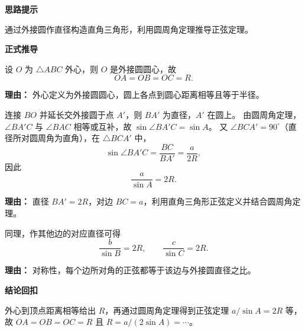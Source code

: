 \begin{proofbox}
	\textbf{\textcolor{CProof}{思路提示}}

	通过外接圆作直径构造直角三角形，利用圆周角定理推导正弦定理。

	\medskip
	\textbf{\textcolor{CProof}{正式推导}}
	\begin{description}[style=nextline, leftmargin=2.8em, labelsep=0.5em, itemsep=0.55em]
		\item[\textbf{步骤一（外心定义）：}]
			设 $O$ 为 $\triangle ABC$ 外心，则 $O$ 是外接圆圆心，故
			\[
				OA = OB = OC = R.
			\]
			\par\textbf{理由：}
			外心定义为外接圆圆心，圆上各点到圆心距离相等且等于半径。

		\item[\textbf{步骤二（构造直径）：}]
			连接 $BO$ 并延长交外接圆于点 $A'$，则 $BA'$ 为直径，$A'$ 在圆上。
			由圆周角定理，$\angle BA'C$ 与 $\angle BAC$ 相等或互补，故 $\sin\angle BA'C = \sin A$。
			又 $\angle BCA' = 90^\circ$（直径所对圆周角为直角），在 $\triangle BCA'$ 中，
			\[
				\sin\angle BA'C = \frac{BC}{BA'} = \frac{a}{2R},
			\]
			因此
			\[
				\frac{a}{\sin A} = 2R.
			\]
			\par\textbf{理由：}
			直径 $BA' = 2R$，对边 $BC = a$，利用直角三角形正弦定义并结合圆周角定理。

		\item[\textbf{步骤三（推广至全等）：}]
			同理，作其他边的对应直径可得
			\[
				\frac{b}{\sin B} = 2R,
				\qquad
				\frac{c}{\sin C} = 2R.
			\]
			\par\textbf{理由：}
			对称性，每个边所对角的正弦都等于该边与外接圆直径之比。
	\end{description}

	\medskip
	\textbf{\textcolor{CProof}{结论回扣}}

	外心到顶点距离相等给出 $R$，再通过圆周角定理得到正弦定理 $a/\sin A = 2R$ 等，故 $OA = OB = OC = R$ 且 $R = a/(2\sin A) = \cdots$。
\end{proofbox}
